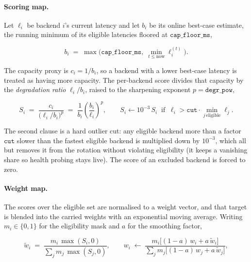 \paragraph{Scoring map.} Let $\ell_i$ be backend $i$'s current latency and let
$b_i$ be its online best-case estimate, the running minimum of its eligible
latencies floored at $\texttt{cap\_floor\_ms}$,

\begin{equation}\label{bm:eq:mono-base}
  b_i \;=\; \max\!\Big(\texttt{cap\_floor\_ms},\;
            \min_{t \le \text{now}} \ell_i^{(t)}\Big).
\end{equation}

The capacity proxy is $c_i = 1/b_i$, so a backend with a lower best-case latency
is treated as having more capacity. The per-backend score divides that capacity
by the \emph{degradation ratio} $\ell_i / b_i$, raised to the sharpening
exponent $p = \texttt{degr\_pow}$,

\begin{equation}\label{bm:eq:mono-score}
  S_i \;=\; \frac{c_i}{\big(\ell_i / b_i\big)^{p}}
        \;=\; \frac{1}{b_i}\left(\frac{b_i}{\ell_i}\right)^{p},
  \qquad
  S_i \leftarrow 10^{-3}\,S_i \ \text{ if } \ \ell_i > \texttt{cut}\cdot
        \min_{j\,\text{eligible}} \ell_j .
\end{equation}

The second clause is a hard outlier cut: any eligible backend more than a factor
$\texttt{cut}$ slower than the fastest eligible backend is multiplied down by
$10^{-3}$, which all but removes it from the rotation without violating
eligibility (it keeps a vanishing share so health probing stays live). The score
of an excluded backend is forced to zero.

\paragraph{Weight map.} The scores over the eligible set are normalised to a
weight vector, and that target is blended into the carried weights with an
exponential moving average. Writing $m_i \in \{0,1\}$ for the eligibility mask
and $a$ for the smoothing factor,

\begin{equation}\label{bm:eq:mono-weight}
  \tilde{w}_i \;=\; \frac{m_i\,\max(S_i,0)}{\sum_{j} m_j\,\max(S_j,0)},
  \qquad
  w_i \;\leftarrow\;
    \frac{m_i\big[(1-a)\,w_i + a\,\tilde{w}_i\big]}
         {\sum_{j} m_j\big[(1-a)\,w_j + a\,\tilde{w}_j\big]},
\end{equation}

